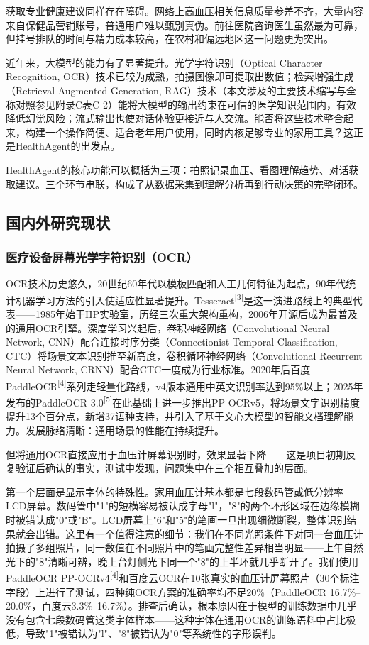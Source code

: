 \documentclass[zihao=-4,a4paper]{ctexart}
\begin{document}
获取专业健康建议同样存在障碍。网络上高血压相关信息质量参差不齐，大量内容来自保健品营销账号，普通用户难以甄别真伪。前往医院咨询医生虽然最为可靠，但挂号排队的时间与精力成本较高，在农村和偏远地区这一问题更为突出。

近年来，大模型的能力有了显著提升。光学字符识别（Optical Character Recognition, OCR）技术已较为成熟，拍摄图像即可提取出数值；检索增强生成（Retrieval-Augmented Generation, RAG）技术（本文涉及的主要技术缩写与全称对照参见附录C表C-2）能将大模型的输出约束在可信的医学知识范围内，有效降低幻觉风险；流式输出也使对话体验更接近与人交流。能否将这些技术整合起来，构建一个操作简便、适合老年用户使用，同时内核足够专业的家用工具？这正是HealthAgent的出发点。

HealthAgent的核心功能可以概括为三项：拍照记录血压、看图理解趋势、对话获取建议。三个环节串联，构成了从数据采集到理解分析再到行动决策的完整闭环。

\subsection{国内外研究现状}

\subsubsection{医疗设备屏幕光学字符识别（OCR）}

OCR技术历史悠久，20世纪60年代以模板匹配和人工几何特征为起点，90年代统计机器学习方法的引入使适应性显著提升。Tesseract\textsuperscript{[3]}是这一演进路线上的典型代表——1985年始于HP实验室，历经三次重大架构重构，2006年开源后成为最普及的通用OCR引擎。深度学习兴起后，卷积神经网络（Convolutional Neural Network, CNN）配合连接时序分类（Connectionist Temporal Classification, CTC）将场景文本识别推至新高度，卷积循环神经网络（Convolutional Recurrent Neural Network, CRNN）配合CTC一度成为行业标准。2020年后百度PaddleOCR\textsuperscript{[4]}系列走轻量化路线，v4版本通用中英文识别率达到95\%以上；2025年发布的PaddleOCR 3.0\textsuperscript{[5]}在此基础上进一步推出PP-OCRv5，将场景文字识别精度提升13个百分点，新增37语种支持，并引入了基于文心大模型的智能文档理解能力。发展脉络清晰：通用场景的性能在持续提升。

但将通用OCR直接应用于血压计屏幕识别时，效果显著下降——这是项目初期反复验证后确认的事实，测试中发现，问题集中在三个相互叠加的层面。

第一个层面是显示字体的特殊性。家用血压计基本都是七段数码管或低分辨率LCD屏幕。数码管中"1"的短横容易被认成字母"l"，"8"的两个环形区域在边缘模糊时被错认成"0"或"B"。LCD屏幕上"6"和"5"的笔画一旦出现细微断裂，整体识别结果就会出错。这里有一个值得注意的细节：我们在不同光照条件下对同一台血压计拍摄了多组照片，同一数值在不同照片中的笔画完整性差异相当明显——上午自然光下的"8"清晰可辨，晚上台灯侧光下同一个"8"的上半环就几乎断开了。我们使用PaddleOCR PP-OCRv4\textsuperscript{[4]}和百度云OCR在10张真实的血压计屏幕照片（30个标注字段）上进行了测试，四种纯OCR方案的准确率均不足20\%（PaddleOCR 16.7\%--20.0\%，百度云3.3\%--16.7\%）。排查后确认，根本原因在于模型的训练数据中几乎没有包含七段数码管这类字体样本——这种字体在通用OCR的训练语料中占比极低，导致"1"被错认为"l"、"8"被错认为"0"等系统性的字形误判。
\end{document}
